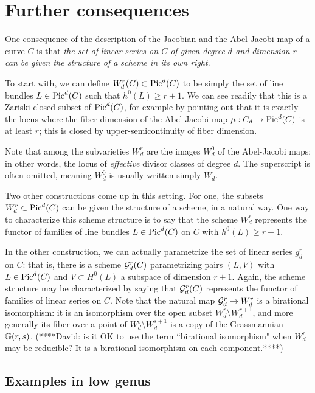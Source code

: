 \section{Further consequences}

One consequence of the description of the Jacobian and the Abel-Jacobi map of a curve $C$ is that \emph{the set of linear series on $C$ of given degree $d$ and dimension $r$ can be given the structure of a scheme in its own right}.

To start with, we can define $W^r_d(C) \subset \Pic^d(C)$ to be simply the set of line bundles $L \in \Pic^d(C)$ such that $h^0(L) \geq r+1$. We can see readily that this is a Zariski closed subset of $\Pic^d(C)$, for example by pointing out that it is exactly the locus where the fiber dimension of the Abel-Jacobi map $\mu : C_d \to \Pic^d(C)$ is at least $r$; this is closed by upper-semicontinuity of fiber dimension. 

Note that among the subvarieties $W^r_d$ are the images $W^0_d$ of the Abel-Jacobi maps; in other words, the locus of \emph{effective} divisor classes of degree $d$. The superscript is often omitted, meaning $W^0_d$ is usually written simply $W_d$.

Two other constructions come up in this setting. For one, the subsets $W^r_d \subset \Pic^d(C)$ can be given the structure of a scheme, in a natural way. One way to characterize this scheme structure is to say that the scheme $W^r_d$ represents the functor of families of line bundles $L \in \Pic^d(C)$ on $C$ with  $h^0(L) \geq r+1$.

In the other construction, we can actually parametrize the set of linear series $g^r_d$ on $C$: that is, there is a scheme $\cG^r_d(C)$ parametrizing pairs $(L, V)$ with $L \in \Pic^d(C)$ and $V \subset H^0(L)$ a subspace of dimension $r+1$. Again, the scheme structure may be characterized by saying that $\cG^r_d(C)$ represents the functor of families of linear series on $C$. Note that the natural map $\cG^r_d \to W^r_d$ is a birational isomorphism: it is an isomorphism over the open subset $W^r_d \setminus W^{r+1}_d$, and more generally its fiber over a point of $W^s_d \setminus W^{s+1}_d$ is a copy of  the Grassmannian $\GG(r, s)$. (****David: is it OK to use the term ``birational isomorphism" when $W^r_d$ may be reducible? It is a birational isomorphism on each component.****)

\subsection{Examples in low genus}

